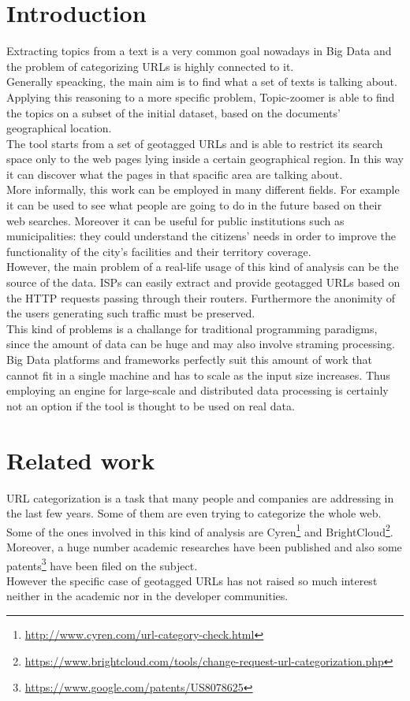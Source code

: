 \documentclass{sig-alternate-05-2015}
\begin{document}
\section{Introduction}
Extracting topics from a text is a very common goal nowadays in Big Data and the problem of categorizing URLs is highly connected to it.\\
Generally speacking, the main aim is to find what a set of texts is talking about. Applying this reasoning to a more specific problem, Topic-zoomer is able to find the topics on a subset of the initial dataset, based on the documents' geographical location.\\
The tool starts from a set of geotagged URLs and is able to restrict its search space only to the web pages lying inside a certain geographical region. In this way it can discover what the pages in that spacific area are talking about.\\
More informally, this work can be employed in many different fields. For example it can be used to see what people are going to do in the future based on their web searches. Moreover it can be useful for public institutions such as municipalities: they could understand the citizens' needs in order to improve the functionality of the city's facilities and their territory coverage.\\
However, the main problem of a real-life usage of this kind of analysis can be the source of the data. ISPs can easily extract and provide geotagged URLs based on the HTTP requests passing through their routers. Furthermore the anonimity of the users generating such traffic must be preserved.\\
This kind of problems is a challange for traditional programming paradigms, since the amount of data can be huge and may also involve straming  processing. Big Data platforms and frameworks perfectly suit this amount of work that cannot fit in a single machine and has to scale as the input size increases. Thus employing an engine for large-scale and distributed data processing is certainly not an option if the tool is thought to be used on real data.        


\section{Related work}
URL categorization is a task that many people and companies are addressing in the last few years. Some of them are even trying to categorize the whole web. Some of the ones involved in this kind of analysis are Cyren\footnote{\url{http://www.cyren.com/url-category-check.html}} and BrightCloud\footnote{\url{https://www.brightcloud.com/tools/change-request-url-categorization.php}}.\\
Moreover, a huge number academic researches have been published and also some patents\footnote{\url{https://www.google.com/patents/US8078625}} have been filed on the subject.\\
However the specific case of geotagged URLs has not raised so much interest neither in the academic nor in the developer communities.
\end{document}
